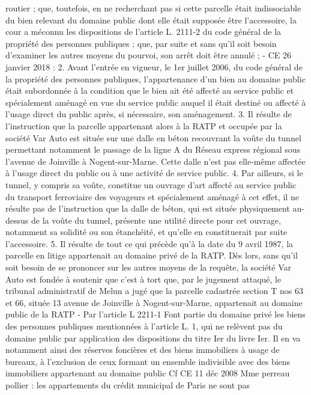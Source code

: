 \documentclass[11pt,a4paper]{report}
\begin{document}
routier ; que, toutefois, en ne recherchant pas si cette parcelle était indissociable du bien relevant du
domaine public dont elle était supposée être l'accessoire, la cour a méconnu les dispositions de
l'article L. 2111-2 du code général de la propriété des personnes publiques ; que, par suite et sans
qu'il soit besoin d'examiner les autres moyens du pourvoi, son arrêt doit être annulé ;
-
CE 26 janvier 2018 : 2. Avant l'entrée en vigueur, le 1er juillet 2006, du code général de la
propriété des personnes publiques, l'appartenance d'un bien au domaine public était subordonnée
à la condition que le bien ait été affecté au service public et spécialement aménagé en vue du
service public auquel il était destiné ou affecté à l'usage direct du public après, si nécessaire, son
aménagement.
3. Il résulte de l'instruction que la parcelle appartenant alors à la RATP et occupée par la société
Var Auto est située sur une dalle en béton recouvrant la voûte du tunnel permettant notamment le
passage de la ligne A du Réseau express régional sous l'avenue de Joinville à Nogent-sur-Marne.
Cette dalle n'est pas elle-même affectée à l'usage direct du public ou à une activité de service
public.
4. Par ailleurs, si le tunnel, y compris sa voûte, constitue un ouvrage d'art affecté au service public
du transport ferroviaire des voyageurs et spécialement aménagé à cet effet, il ne résulte pas de
l'instruction que la dalle de béton, qui est située physiquement au-dessus de la voûte du tunnel,
présente une utilité directe pour cet ouvrage, notamment sa solidité ou son étanchéité, et qu'elle en
constituerait par suite l'accessoire.
5. Il résulte de tout ce qui précède qu'à la date du 9 avril 1987, la parcelle en litige appartenait au
domaine privé de la RATP. Dès lors, sans qu'il soit besoin de se prononcer sur les autres moyens
de la requête, la société Var Auto est fondée à soutenir que c'est à tort que, par le jugement
attaqué, le tribunal administratif de Melun a jugé que la parcelle cadastrée section T nos 63 et 66,
située 13 avenue de Joinville à Nogent-sur-Marne, appartenait au domaine public de la RATP
-
Par l’article L 2211-1 Font partie du domaine privé les biens des personnes publiques mentionnées
à l'article L. 1, qui ne relèvent pas du domaine public par application des dispositions du titre Ier
du livre Ier.
Il en va notamment ainsi des réserves foncières et des biens immobiliers à usage de bureaux, à
l'exclusion de ceux formant un ensemble indivisible avec des biens immobiliers appartenant au
domaine public
Cf CE 11 déc 2008 Mme perreau pollier  : les appartements du crédit municipal de Paris ne sont pas
\end{document}

